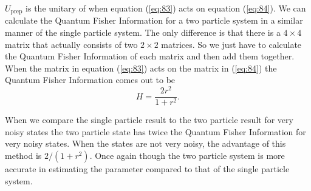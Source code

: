 \documentclass[twocolumn]{article}
\begin{document}
$U_{\text{prep}}$ is the unitary of when equation (\ref{eq:83}) acts on equation (\ref{eq:84}). We can calculate the Quantum Fisher Information for a two particle system in a similar manner of the single particle system. The only difference is that there is a $4\times4$ matrix that actually consists of two $2\times2$ matrices. So we just have to calculate the Quantum Fisher Information of each matrix and then add them together. When the matrix in equation (\ref{eq:83}) acts on the matrix in (\ref{eq:84}) the Quantum Fisher Information comes out to be
\begin{equation} \label{eq:85}
H=\frac{2r^2}{1+r^2}.
\end{equation}

When we compare the single particle result to the two particle result for very noisy states the two particle state has twice the Quantum Fisher Information for very noisy states. When the states are not very noisy, the advantage of this method is $2/(1+r^2)$. Once again though the two particle system is more accurate in estimating the parameter compared to that of the single particle system. 
\end{document}
